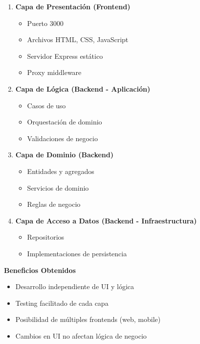 \documentclass[12pt,a4paper]{article}
\begin{document}
\begin{enumerate}
    \item \textbf{Capa de Presentación (Frontend)}
    \begin{itemize}
        \item Puerto 3000
        \item Archivos HTML, CSS, JavaScript
        \item Servidor Express estático
        \item Proxy middleware
    \end{itemize}

    \item \textbf{Capa de Lógica (Backend - Aplicación)}
    \begin{itemize}
        \item Casos de uso
        \item Orquestación de dominio
        \item Validaciones de negocio
    \end{itemize}

    \item \textbf{Capa de Dominio (Backend)}
    \begin{itemize}
        \item Entidades y agregados
        \item Servicios de dominio
        \item Reglas de negocio
    \end{itemize}

    \item \textbf{Capa de Acceso a Datos (Backend - Infraestructura)}
    \begin{itemize}
        \item Repositorios
        \item Implementaciones de persistencia
    \end{itemize}
\end{enumerate}

\textbf{Beneficios Obtenidos}

\begin{itemize}
    \item Desarrollo independiente de UI y lógica
    \item Testing facilitado de cada capa
    \item Posibilidad de múltiples frontends (web, mobile)
    \item Cambios en UI no afectan lógica de negocio
\end{itemize}
\end{document}
